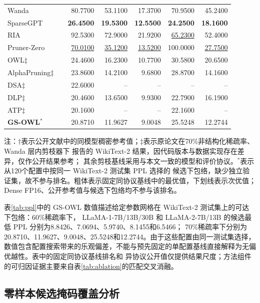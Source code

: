 \documentclass[UTF8,fontset=fandol]{ctexart}
\newcommand{\best}[1]{\textbf{#1}}
\newcommand{\second}[1]{\underline{#1}}
\begin{document}
\begin{table}[!htbp]
\begin{tabular*}{0.98\textwidth}{@{\extracolsep{\fill}}lcrrrrr@{}}
  Wanda & & 80.7700 & 53.1100 & 17.3700 & 70.9500 & 45.2400 \\
  SparseGPT & & \best{26.4500} & \best{19.5300} & \best{12.5500} & \best{24.2500} & \best{18.1600} \\
  RIA & & 92.5300 & 72.9000 & 21.9200 & \second{65.2300} & 52.4000 \\
  Pruner-Zero & & \second{70.0100} & \second{35.1200} & \second{13.5200} & 100.0000 & \second{27.7500} \\
  OWL$\ddagger$ & & 24.4600 & 16.2300 & 10.7700 & 30.5800 & 20.6500 \\
  AlphaPruning$\ddagger$ & & 23.8600 & 14.2100 & 9.6800 & 28.8700 & 14.1600 \\
  DSA$\ddagger$ & & 22.6000 & -- & -- & -- & -- \\
  DLP$\ddagger$ & & 20.4600 & 13.6500 & 9.9300 & 22.7900 & 16.1900 \\
  ATP$\ddagger$ & & 20.1600 & -- & -- & 22.1600 & -- \\
  \textbf{GS-OWL}$^\ast$ & & 20.8710 & 11.9627 & 9.0048 & 25.5248 & 12.2744 \\
\bottomrule
\end{tabular*}
\vspace{2pt}
\parbox{0.98\textwidth}{\scriptsize
注：$\dagger$表示公开文献中的同模型稠密参考值；$\ddagger$表示原论文在70\%非结构化稀疏率、Wanda 层内剪枝器下
报告的 WikiText-2 结果\cite{owl,alphapruning,dsa,dlp,atp}，因代码版本与数据实现存在差异，仅作公开结果参考；
其余剪枝基线采用与本文一致的模型和评价协议。$^\ast$表示从120个配置中按同一 WikiText-2 测试集 PPL 选择的
候选下包络，缺少独立验证集，故不参与排名。粗体表示固定同协议基线中的最优值，下划线表示次优值；
Dense FP16、公开参考值与候选下包络均不参与该排名。}
\end{table}

表\ref{tab:ppl}中的 GS-OWL 数值描述给定参数网格在 WikiText-2 测试集上的可达下包络：60\%稀疏率下，
LLaMA-1-7B/13B/30B 和 LLaMA-2-7B/13B 的候选最低 PPL 分别为8.8426、7.0694、5.9740、8.1455和6.5466；
70\%稀疏率下分别为20.8710、11.9627、9.0048、25.5248和12.2744。由于这些配置由同一测试集选择，
数值包含配置搜索带来的乐观偏差，不能与预先固定的单配置基线直接解释为无偏优越性。表中的固定同协议基线排名和
异协议公开值仅提供结果尺度；方法组件的可归因证据主要来自表\ref{tab:ablation}的匹配交叉消融。

\FloatBarrier
\subsection{零样本候选掩码覆盖分析}
\end{document}
